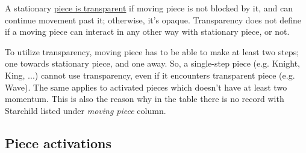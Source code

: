 
A stationary \hyperref[fig:scn_mv_011_wave_is_transparent]{piece is transparent}
if moving piece is not blocked by it, and can continue movement past it; otherwise,
it's opaque. Transparency does not define if a moving piece can interact in any
other way with stationary piece, or not.

To utilize transparency, moving piece has to be able to make at least two steps;
one towards stationary piece, and one away. So, a single-step piece (e.g. Knight,
King, ...) cannot use transparency, even if it encounters transparent piece (e.g.
Wave). The same applies to activated pieces which doesn't have at least two momentum.
This is also the reason why in the table there is no record with Starchild listed
under \emph{moving piece} column.

\clearpage %

\subsection*{Piece activations}
\label{sec:Appendix/Summary/Piece activations}

